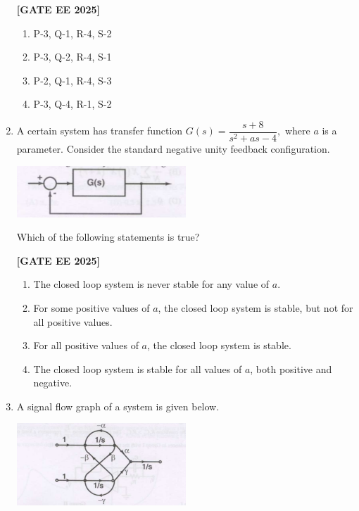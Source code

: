 \documentclass[12pt]{article}
\begin{document}
\begin{enumerate}[leftmargin=*, label=\textbf{Q.\arabic*:}]
\noindent \textbf{[GATE EE 2025]}
\begin{enumerate}[label=(\Alph*)]
  \item P-3, Q-1, R-4, S-2
  \item P-3, Q-2, R-4, S-1
  \item P-2, Q-1, R-4, S-3
  \item P-3, Q-4, R-1, S-2
\end{enumerate}

\item A certain system has transfer function $G(s) = \dfrac{s+8}{s^2 + a s - 4},$ where $a$ is a parameter. Consider the standard negative unity feedback configuration.

\begin{center}
\includegraphics[width=0.5\textwidth]{figs/q39.png}
\end{center}

Which of the following statements is true?
 
\noindent \textbf{[GATE EE 2025]}
\begin{enumerate}[label=(\Alph*)]
  \item The closed loop system is never stable for any value of $a$.
  \item For some positive values of $a$, the closed loop system is stable, but not for all positive values.
  \item For all positive values of $a$, the closed loop system is stable.
  \item The closed loop system is stable for all values of $a$, both positive and negative.
\end{enumerate}
\newpage
\item A signal flow graph of a system is given below.

\begin{center}
\includegraphics[width=0.5\textwidth]{figs/q40.png}
\end{center}



\end{enumerate}
\end{document}

